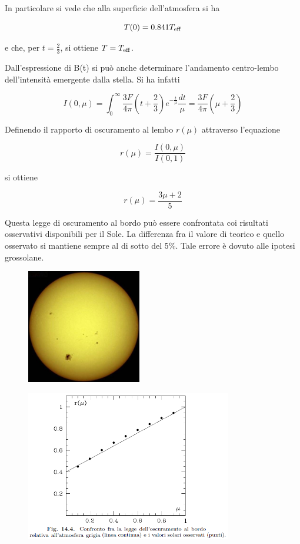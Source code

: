 In particolare si vede che alla superficie dell'atmosfera si ha

$$T(0)=0.841T_{\rm eff}$$

e che, per $t=\frac23$, si ottiene $T=T_{\rm eff}$.

Dall'espressione di B(t) si può anche determinare l'andamento centro-lembo dell'intensità emergente dalla stella. Si ha infatti

$$I(0,\mu)=\int_{0}^{\infty} \frac{3F}{4 \pi} \left( t + \frac{2}{3} \right) e^{-\frac{t}{\mu}} \frac{dt}{\mu}
=\frac{3F}{4\pi} \left( \mu + \frac{2}{3} \right)$$

Definendo il rapporto di oscuramento al lembo $r(\mu)$ attraverso l'equazione

$$r(\mu)=\frac{I(0,\mu)}{I(0,1)}$$

si ottiene

$$r(\mu)=\frac{3\mu + 2}{5}$$

Questa legge di oscuramento al bordo può essere confrontata coi risultati osservativi disponibili per il Sole. La differenza fra il valore di teorico e quello osservato si mantiene sempre al di sotto del 5\%. Tale errore è dovuto alle ipotesi grossolane.

\begin{minipage}{0.35\textwidth}
    \begin{figure}[H]
        \centering
        \includegraphics[width=5cm]{limb dark 1.jpg}
    \end{figure}
\end{minipage}
\begin{minipage}{0.65\textwidth}
    \begin{figure}[H]
        \centering
        \includegraphics[width=9cm]{immagini/grafico_limb_darkening.png}
    \end{figure}
\end{minipage}


